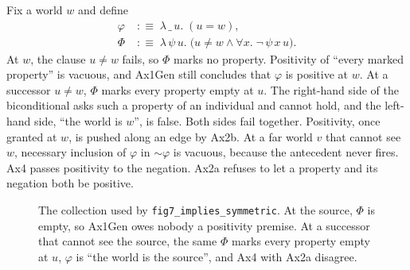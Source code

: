\documentclass[11pt,a4paper]{article}
\newcommand{\lean}[1]{\texttt{#1}}
\theoremstyle{definition}
\theoremstyle{remark}
\begin{document}
Fix a world \(w\) and define
\begin{align*}
  \varphi &\;:\equiv\; \lambda\,\_\,u.\; (u = w),\\
  \Phi &\;:\equiv\; \lambda\,\psi\,u.\;
    \bigl(u \neq w \land \forall x.\; \neg\, \psi\,x\,u\bigr).
\end{align*}
At \(w\), the clause \(u \neq w\) fails, so \(\Phi\) marks no property.
Positivity of ``every marked property'' is vacuous, and Ax1Gen still concludes
that \(\varphi\) is positive at \(w\).
At a successor \(u \neq w\), \(\Phi\) marks every property empty at \(u\).
The right-hand side of the biconditional asks such a property of an individual
and cannot hold, and the left-hand side, ``the world is \(w\)'', is false.
Both sides fail together.
Positivity, once granted at \(w\), is pushed along an edge by Ax2b.
At a far world \(v\) that cannot see \(w\), necessary inclusion of \(\varphi\)
in \(\sim\varphi\) is vacuous, because the antecedent never fires.
Ax4 passes positivity to the negation.
Ax2a refuses to let a property and its negation both be positive.

\begin{figure}[t]
\centering
{}
\caption{The collection used by \lean{fig7\_implies\_symmetric}.
At the source, \(\Phi\) is empty, so Ax1Gen owes nobody a positivity premise.
At a successor that cannot see the source, the same \(\Phi\) marks every
property empty at \(u\), \(\varphi\) is ``the world is the source'', and Ax4
with Ax2a disagree.}
\label{fig:phi}
\end{figure}
\end{document}

